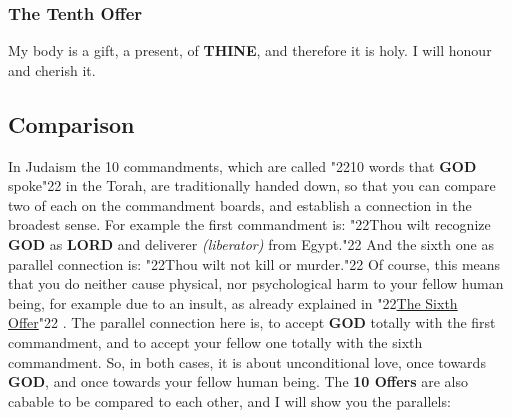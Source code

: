 \documentclass[10pt,a5paper]{article}
\newcommand{\God}[0]{\textbf{GOD}}
\newcommand{\Lord}[0]{\textbf{LORD}}
\newcommand{\Thine}[0]{\textbf{THINE}}
\newcommand{\q}[1]{\char"22{#1}\char"22 }
\begin{document}
	\subsubsection{The Tenth Offer} \label{TheTenthOffer}
		My body is a gift, a present, of {\Thine},
		and therefore it is holy.
		I will honour and cherish it.
	
	\subsection{Comparison}
		In Judaism the 10 commandments,
		which are called \q{10 words that {\God} spoke} in the Torah,
		are traditionally handed down,
		so that you can compare two of each on the commandment boards,
		and establish a connection in the broadest sense.
		For example the first commandment is:
		\q{Thou wilt recognize {\God} as {\Lord} and deliverer \textit{(liberator)} from Egypt.}
		And the sixth one as parallel connection is:
		\q{Thou wilt not kill or murder.}
		Of course,
		this means that you do neither cause physical,
		nor psychological harm to your fellow human being,
		for example due to an insult,
		as already explained in \q{\hyperref[TheSixthOffer]{The Sixth Offer}}.
		The parallel connection here is,
		to accept {\God} totally with the first commandment,
		and to accept your fellow one totally with the sixth commandment.
		So,
		in both cases,
		it is about unconditional love,
		once towards {\God},
		and once towards your fellow human being.
		The \textbf{10 Offers} are also cabable to be compared to each other,
		and I will show you the parallels:
		\\
\end{document}
